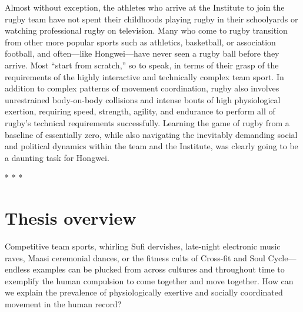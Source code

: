 Almost without exception, the athletes who arrive at the Institute to join the rugby team have not spent their childhoods playing rugby in their schoolyards or watching professional rugby on television. Many who come to rugby transition from other more popular sports such as athletics, basketball, or association football, and often---like Hongwei---have never seen a rugby ball before they arrive.  Most ``start from scratch,'' so to speak, in terms of their grasp of the requirements of the highly interactive and technically complex team sport. In addition to complex patterns of movement coordination, rugby also involves unrestrained body-on-body collisions and intense bouts of high physiological exertion, requiring speed, strength, agility, and endurance to perform all of rugby's technical requirements successfully.  Learning the game of rugby from a baseline of essentially zero, while also navigating the inevitably demanding  social and political dynamics within the team and the Institute, was clearly going to be a daunting task for Hongwei.
\begin{center}
  * * *
\end{center}

\section{Thesis overview}

Competitive team sports, whirling Sufi dervishes, late-night electronic music raves, Maasi ceremonial dances, or the fitness cults of Cross-fit and Soul Cycle---endless examples can be plucked from across cultures and throughout time to exemplify the human compulsion to come together and move together.  How can we explain the prevalence of physiologically exertive and socially coordinated movement in the human record?

